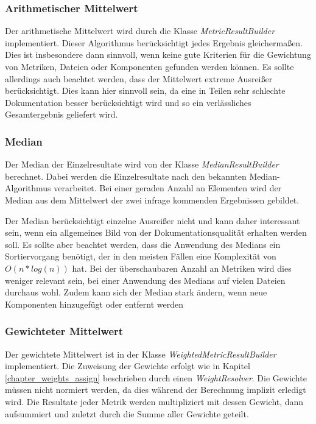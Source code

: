 \subsubsection{Arithmetischer Mittelwert}
Der arithmetische Mittelwert wird durch die Klasse \textit{MetricResultBuilder} implementiert. Dieser Algorithmus berücksichtigt jedes Ergebnis gleichermaßen. Dies ist insbesondere dann sinnvoll, wenn keine gute Kriterien für die Gewichtung von Metriken, Dateien oder Komponenten gefunden werden können. Es sollte allerdings auch beachtet werden, dass der Mittelwert extreme Ausreißer berücksichtigt. Dies kann hier sinnvoll sein, da eine in Teilen sehr schlechte Dokumentation besser berücksichtigt wird und so ein verlässliches Gesamtergebnis geliefert wird.


\subsubsection{Median}
Der Median der Einzelresultate wird von der Klasse \textit{MedianResultBuilder} berechnet. Dabei werden die Einzelresultate nach den bekannten Median-Algorithmus verarbeitet. Bei einer geraden Anzahl an Elementen wird der Median aus dem Mittelwert der zwei infrage kommenden Ergebnissen gebildet. 

Der Median berücksichtigt einzelne Ausreißer nicht und kann daher interessant sein, wenn ein allgemeines Bild von der Dokumentationsqualität erhalten werden soll. Es sollte aber beachtet werden, dass die Anwendung des Medians ein Sortiervorgang benötigt, der in den meisten Fällen eine Komplexität von $O(n*log(n))$ hat. Bei der überschaubaren Anzahl an Metriken wird dies weniger relevant sein, bei einer Anwendung des Medians auf vielen Dateien durchaus wohl. Zudem kann sich der Median stark ändern, wenn neue Komponenten hinzugefügt oder entfernt werden


\subsubsection{Gewichteter Mittelwert}
Der gewichtete Mittelwert ist in der Klasse \textit{WeightedMetricResultBuilder} implementiert. Die Zuweisung der Gewichte erfolgt wie in Kapitel \ref{chapter_weights_assign} beschrieben durch einen \textit{WeightResolver}. Die Gewichte müssen nicht normiert werden, da dies während der Berechnung implizit erledigt wird. Die Resultate jeder Metrik werden multipliziert mit dessen Gewicht, dann aufsummiert und zuletzt durch die Summe aller Gewichte geteilt. 


